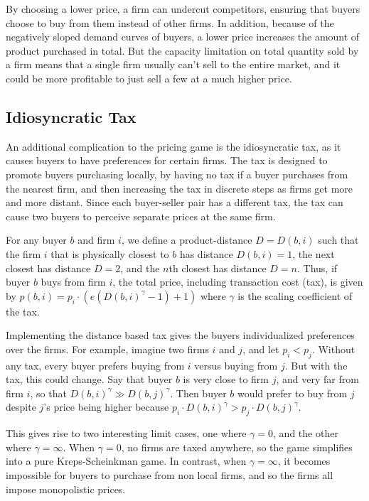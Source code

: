 \documentclass[11pt]{article}
\begin{document}
By choosing a lower price, a firm can undercut competitors, ensuring that
buyers choose to buy from them instead of other firms. In addition, because
of the negatively sloped demand curves of buyers, a lower price increases the
amount of product purchased in total. But the capacity limitation on total
quantity sold by a firm means that a single firm usually can't sell to the
entire market, and it could be more profitable to just sell a few at a much
higher price.

\subsection{Idiosyncratic Tax}
An additional complication to the pricing game is the idiosyncratic tax, as it
causes buyers to have preferences for certain firms. The tax is designed to
promote buyers purchasing locally, by having no tax if a buyer purchases from
the nearest firm, and then increasing the tax in discrete steps as firms get
more and more distant. Since each buyer-seller pair has a different tax, the
tax can cause two buyers to perceive separate prices at the same firm.

For any buyer $b$ and firm $i$, we define a product-distance $D = D(b,i)$ such
that the firm $i$ that is physically closest to $b$ has distance $D(b,i)=1$,
the next closest has distance $D=2$, and the $n$th closest has distance $D=n$. 
Thus, if buyer $b$ buys from firm $i$, the total price, including transaction
cost (tax), is given by $p(b,i) = p_i \cdot (e(D(b,i)^\gamma -1) + 1)$ where
$\gamma$ is the scaling coefficient of the tax.

Implementing the distance based tax gives the buyers individualized preferences
over the firms. For example, imagine two firms $i$ and $j$, and let $p_i <
p_j$. Without any tax, every buyer prefers buying from $i$ versus buying from
$j$. But with the tax, this could change. Say that buyer $b$ is very close to
firm $j$, and very far from firm $i$, so that $D(b,i)^\gamma \gg
D(b,j)^\gamma$. Then buyer $b$ would prefer to buy from $j$ despite $j$'s price
being higher because $p_i\cdot D(b,i)^\gamma > p_j\cdot D(b,j)^\gamma$.

This gives rise to two interesting limit cases, one where $\gamma = 0$, and the
other where $\gamma = \infty$.  When $\gamma = 0$, no firms are taxed anywhere,
so the game simplifies into a pure Kreps-Scheinkman game. In contrast, when
$\gamma = \infty$, it becomes impossible for buyers to purchase from non local
firms, and so the firms all impose monopolistic prices.
\end{document}
